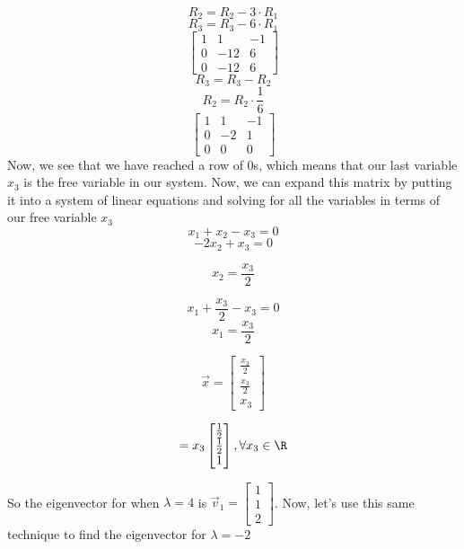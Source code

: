 \begin{enumerate}
{    $$R_2=R_2-3\cdot R_1$$
    $$R_3=R_3-6\cdot R_1$$
    $$
    \begin{bmatrix} 1 & 1 & -1\\ 
	               0 & -12 & 6\\
	               0 & -12 & 6
	\end{bmatrix}
	$$
	$$R_3=R_3-R_2$$
    $$R_2=R_2\cdot \frac{1}{6}$$
    $$
    \begin{bmatrix} 1 & 1 & -1\\ 
	               0 & -2 & 1\\
	               0 & 0 & 0
	\end{bmatrix}
	$$
	Now, we see that we have reached a row of 0s, which means that our last variable $x_3$ is the free variable in our system. Now, we can expand this matrix by putting it into a system of linear equations and solving for all the variables in terms of our free variable $x_3$
	$$x_1 +x_2 - x_3 = 0$$
	$$-2x_2 + x_3 = 0$$
	
	$$x_2 = \frac{x_3}{2}$$
	
	$$x_1 + \frac{x_3}{2} - x_3 = 0$$
	$$x_1 = \frac{x_3}{2}$$
	
	
	$$
    \vec{x} = \begin{bmatrix} \frac{x_3}{2} \\ \frac{x_3}{2} \\ x_3
    \end{bmatrix}
    $$
    
    $$
    = x_3 \begin{bmatrix} \frac{1}{2} \\ \frac{1}{2} \\ 1
    \end{bmatrix}, \forall x_3 \in \R
    $$
    
    So the eigenvector for when $\lambda = 4$ is $\vec{v}_1 =\begin{bmatrix} 1 \\ 1 \\ 2
    \end{bmatrix}$. Now, let's use this same technique to find the eigenvector for $\lambda = -2$

}


\end{enumerate}
